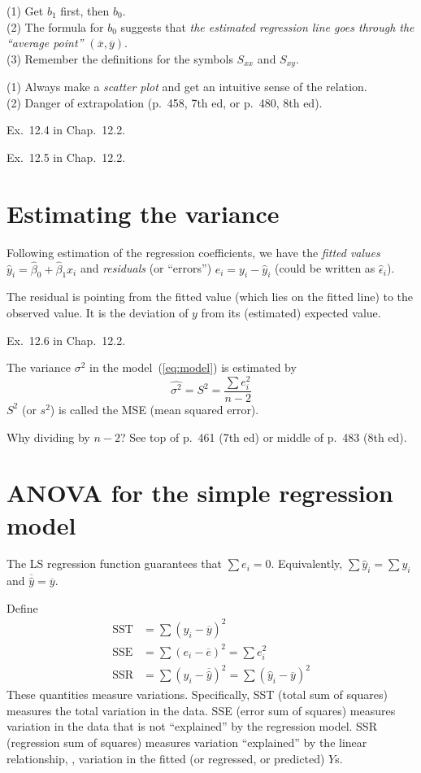 \documentclass[12pt]{article}
\begin{document}
\alert
(1) Get $b_1$ first, then $b_0$.\\
(2) The formula for $b_0$ suggests that
\emph{the estimated regression line goes through
the ``average point'' $(\overline{x}, \overline{y})$}.\\
(3) Remember the definitions for the symbols $S_{xx}$ and $S_{xy}$.

\alert[Cautions]%
(1) Always make a \emph{scatter plot} and get an intuitive sense of the
relation.\\
(2) Danger of extrapolation (p.~458, 7th ed, or p.~480, 8th ed).

\example Ex.~12.4 in Chap.~12.2.

\example Ex.~12.5 in Chap.~12.2.

\section{Estimating the variance}

Following estimation of the regression coefficients, we have
the \emph{fitted values}
$\hat{y}_i = \hat{\beta}_0 + \hat{\beta}_1x_i$
and \emph{residuals} (or ``errors'')
$e_i = y_i - \hat{y}_i$
(could be written as $\hat{\epsilon}_i$).

\alert
The residual is pointing from the fitted value
(which lies on the fitted line) to the observed value.
It is the deviation of $y$ from its (estimated) expected value.

\example
Ex.~12.6 in Chap.~12.2.

The variance $\sigma^2$ in the model~(\ref{eq:model}) is estimated by
\begin{equation}\label{eq:S2}
\hat{\sigma^2} = S^2 = \frac{\sum e_i^2}{n-2}
\end{equation}
$S^2$ (or $s^2$) is called the MSE (mean squared error).

Why dividing by $n-2$? See top of p.~461 (7th ed) or middle of p.~483
(8th ed).


\section{ANOVA for the simple regression model}

\alert[Fact]%
The LS regression function guarantees that
$\sum e_i = 0$.
Equivalently,
$\sum \hat{y}_i = \sum y_i$
and
$\overline{\hat{y}} = \overline{y}$.

Define
\begin{align*}
\text{SST} &= \sum (y_i - \overline{y})^2\\
\text{SSE} &= \sum (e_i - \overline{e})^2 = \sum e_i^2\\
\text{SSR} &= \sum (\hat{y}_i - \overline{\hat{y}})^2
            = \sum (\hat{y}_i - \overline{y})^2
\end{align*}
These quantities measure variations.
Specifically,
SST (total sum of squares) measures
the total variation in the data.
SSE (error sum of squares) measures
variation in the data that is not ``explained'' by the regression model.
SSR (regression sum of squares) measures
variation ``explained'' by the linear relationship,
\ie, variation in the
fitted (or regressed, or predicted) $Y$s.
\end{document}
